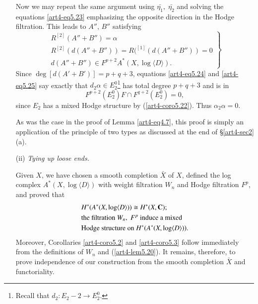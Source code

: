 \begin{enumerate}
Now we may repeat the same argument using $\bar{\eta_1},\; \bar{\eta_2}$ and solving the equations \eqref{art4-eq5.23} emphasizing the opposite direction in the Hodge filtration. This leads to $A''$, $B''$ satisfying
\begin{equation}
\left.
\begin{array}{c}
R^{[2]} (A'' + B'') =\alpha\\
R^{[2]} (d (A''+B'')) = R(^{[1]} (d (A''+B'')) =0\\
d(A''+B'') \in F^{p+2} A^\ast (X, \log \langle D \rangle).
\end{array}
\right\} \label{art4-eq5.25}
\end{equation}
Since $\deg [d(A'+ B')] = p + q +3$, equations \eqref{art4-eq5.24} and \eqref{art4-eq5.25} say exactly that $d_2 \alpha \in E^0_2$\footnote[23]{Recall that $d_2 : E_2 -2 \to E^0_2$.} has total degree $p+q+3$ and is in 
$$
F^{p+2} (E^0_2) F \cap F^{q+2} (E^0_2) = 0,
$$
since $E_2$ has a mixed Hodge structure by (\ref{art4-coro5.22}). Thus $\alpha_2 \alpha = 0$.

\begin{remark*}
As was the case in the proof of Lemma \eqref{art4-eq4.7}, this proof is simply an application of the principle of two types as discussed at the end of \S \ref{art4-sec2} (a).
\end{remark*}

\item[(ii)] \textit{Tying up loose ends.}

Given $X$, we have chosen a smooth completion $\bar{X}$ of $X$, defined the log complex $A^\ast (X, \log \langle D \rangle)$ with weight filtration $W_n$ and Hodge filtration $F^p$, and proved that 
\begin{align*}
& H^\ast (A^\ast (X, \log \langle D \rangle )) \cong H^\ast (X, \mathbf{C});\\
& \text{the filtration $W_n, \; F^p$ induce a mixed} \\
& \text{Hodge structure on $H^\ast (A^\ast (X, \log \langle D \rangle))$.}
\end{align*}\pageoriginale
Moreover, Corollaries \ref{art4-coro5.2} and \ref{art4-coro5.3} follow immediately from the definitions of $W_n$ and (\ref{art4-lem5.20}). It remains, therefore, to prove independence of our construction from the smooth completion $\bar{X}$ and functoriality.


\end{enumerate}
